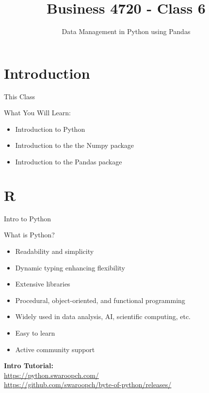\documentclass[ignorenonframetext,xcolor=x11names]{beamer}
\title{Business 4720 - Class 6}
\subtitle{Data Management in Python using Pandas}
\begin{document}
\begin{frame}[label=full]{}
  \titlepage
  \footnotesize
  
\end{frame}

\section{Introduction}

\begin{frame}[label=full]{This Class}

\begin{block}{What You Will Learn:}
\begin{itemize}
  \item Introduction to Python
  \item Introduction to the the Numpy package
  \item Introduction to the Pandas package
\end{itemize}
\end{block}
\end{frame}

\section{R}

\begin{frame}[label=full]{Intro to Python}
\begin{block}{What is Python?}
\begin{itemize}
    \item Readability and simplicity
    \item Dynamic typing enhancing flexibility
    \item Extensive libraries
    \item Procedural, object-oriented, and functional programming
    \item Widely used in data analysis, AI, scientific computing, etc.
    \item Easy to learn
    \item Active community support
\end{itemize}
\end{block}
\vspace{3mm}
\textbf{Intro Tutorial:} \\
\url{https://python.swaroopch.com/} \\
\url{https://github.com/swaroopch/byte-of-python/releases/}
\end{frame}
\end{document}
